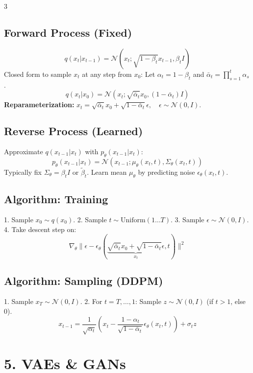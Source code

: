\documentclass[10pt]{article}
\newcommand{\N}{\mathcal{N}}
\begin{document}
\begin{multicols*}{3}
\subsection*{Forward Process (Fixed)}
$$ q(x_t | x_{t-1}) = \N(x_t; \sqrt{1-\beta_t}x_{t-1}, \beta_t I) $$
Closed form to sample $x_t$ at any step from $x_0$:
Let $\alpha_t = 1 - \beta_t$ and $\bar{\alpha}_t = \prod_{s=1}^t \alpha_s$.
$$ q(x_t | x_0) = \N(x_t; \sqrt{\bar{\alpha}_t}x_0, (1 - \bar{\alpha}_t)I) $$
\textbf{Reparameterization:} $x_t = \sqrt{\bar{\alpha}_t}x_0 + \sqrt{1-\bar{\alpha}_t}\epsilon, \quad \epsilon \sim \N(0,I)$.

\subsection*{Reverse Process (Learned)}
Approximate $q(x_{t-1}|x_t)$ with $p_\theta(x_{t-1}|x_t)$:
$$ p_\theta(x_{t-1}|x_t) = \N(x_{t-1}; \mu_\theta(x_t, t), \Sigma_\theta(x_t, t)) $$
Typically fix $\Sigma_\theta = \beta_t I$ or $\tilde{\beta}_t$.
Learn mean $\mu_\theta$ by predicting noise $\epsilon_\theta(x_t, t)$.

\subsection*{Algorithm: Training}
1. Sample $x_0 \sim q(x_0)$.
2. Sample $t \sim \text{Uniform}(1 \dots T)$.
3. Sample $\epsilon \sim \N(0, I)$.
4. Take descent step on:
$$ \nabla_\theta \| \epsilon - \epsilon_\theta(\underbrace{\sqrt{\bar{\alpha}_t}x_0 + \sqrt{1-\bar{\alpha}_t}\epsilon}_{x_t}, t) \|^2 $$

\subsection*{Algorithm: Sampling (DDPM)}
1. Sample $x_T \sim \N(0, I)$.
2. For $t = T, \dots, 1$:
   Sample $z \sim \N(0, I)$ (if $t>1$, else $0$).
   $$ x_{t-1} = \frac{1}{\sqrt{\alpha_t}} \left( x_t - \frac{1-\alpha_t}{\sqrt{1-\bar{\alpha}_t}} \epsilon_\theta(x_t, t) \right) + \sigma_t z $$

\section*{5. VAEs \& GANs}


\end{multicols*}
\end{document}
